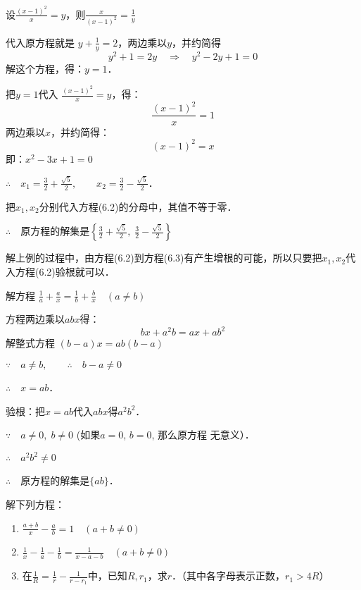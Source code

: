 \begin{solution}
设$\frac{(x-1)^2}{x}=y$，则$\frac{x}{(x-1)^2}=\frac{1}{y}$

代入原方程就是 $y+\frac{1}{y}=2$，两边乘以$y$，并约简得
\[y^2+1=2y\quad \Rightarrow\quad y^2-2y+1=0\]
解这个方程，得：$y=1$．

把$y=1$代入 $\frac{(x-1)^2}{x}=y$，得：
\begin{equation}
    \frac{(x-1)^2}{x}=1
\end{equation}
两边乘以$x$，并约简得：
\begin{equation}
    (x-1)^2=x
\end{equation}
即：$x^2-3x+1=0$

$\therefore\quad x_1=\frac{3}{2}+\frac{\sqrt{5}}{2},\qquad x_2=\frac{3}{2}-\frac{\sqrt{5}}{2}$．

把$x_1,x_2$分别代入方程(6.2)的分母中，其值不等于零．

$\therefore\quad $原方程的解集是$\left\{\frac{3}{2}+\frac{\sqrt{5}}{2},\; \frac{3}{2}-\frac{\sqrt{5}}{2}\right\}$

\end{solution}

\begin{note}
   解上例的过程中，由方程(6.2)到方程(6.3)有产生增根的可能，所以只要把$x_1,x_2$代入方程(6.2)验根就可以．
\end{note}



\begin{example}
    解方程
$\frac{1}{a}+\frac{a}{x}=\frac{1}{b}+\frac{b}{x}\quad (a\ne b)$
\end{example}

\begin{solution}
    方程两边乘以$abx$得：
\[bx+a^2b=ax+ab^2\]
解整式方程 $(b-a)x=ab(b-a)$

$\because\quad a\ne b,\qquad \therefore\quad b-a\ne 0$

$\therefore\quad x=ab$．

验根：把$x=ab$代入$abx$得$a^2b^2$．

$\because\quad a\ne 0,\; b\ne 0$ (如果$a=0$, $b=0$, 那么原方程
无意义）．

$\therefore\quad a^2b^2\ne 0$

$\therefore\quad $原方程的解集是$\{ab\}$．
\end{solution}

\begin{ex}
    解下列方程：
\begin{enumerate}
    \item $\frac{a+b}{x}-\frac{a}{b}=1\quad (a+b\ne 0)$
    \item $\frac{1}{x}-\frac{1}{a}-\frac{1}{b}=\frac{1}{x-a-b}\quad (a+b\ne 0)$
    \item 在$\frac{1}{R}=\frac{1}{r}-\frac{1}{r-r_1}$中，已知$R,r_1$，求$r$．（其中各字母表示正数，$r_1>4R$）
\end{enumerate}
\end{ex}

